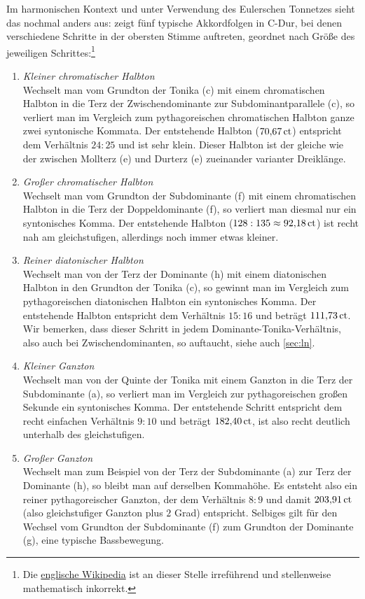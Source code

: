 Im harmonischen Kontext und unter Verwendung des Eulerschen Tonnetzes sieht das
nochmal anders aus:  zeigt fünf typische Akkordfolgen in C-Dur,
bei denen verschiedene Schritte in der obersten Stimme auftreten, geordnet nach
Größe des jeweiligen Schrittes:\footnote{Die
  \href{https://en.wikipedia.org/wiki/Semitone\#Just_intonation}{englische
    Wikipedia} ist an dieser Stelle irreführend und stellenweise mathematisch
  inkorrekt.}
\begin{enumerate}
\item \emph{Kleiner chromatischer Halbton}\\
  Wechselt man vom Grundton der Tonika (c) mit einem chromatischen Halbton in
  die Terz der Zwischendominante zur Subdominantparallele (\sharpmm c), so
  verliert man im Vergleich zum pythagoreischen chromatischen Halbton ganze zwei
  syntonische Kommata. Der entstehende Halbton ($70{,}67\,\text{ct}$) entspricht dem
  Verhältnis $24:25$ und ist sehr klein. Dieser Halbton ist der gleiche wie der
  zwischen Mollterz (\flatp e) und Durterz (\naturalm e) zueinander varianter
  Dreiklänge.
\item \emph{Großer chromatischer Halbton}\\
  Wechselt man vom Grundton der Subdominante (f) mit einem chromatischen Halbton
  in die Terz der Doppeldominante (\sharpm f), so verliert man diesmal nur ein
  syntonisches Komma.  Der entstehende Halbton ($128:135\approx 92{,}18\,\text{ct}$)
  ist recht nah am gleichstufigen, allerdings noch immer etwas
  kleiner.
\item \emph{Reiner diatonischer Halbton}\\
  Wechselt man von der Terz der Dominante (\naturalm h) mit einem diatonischen
  Halbton in den Grundton der Tonika (c), so gewinnt man im Vergleich zum
  pythagoreischen diatonischen Halbton ein syntonisches Komma.  Der entstehende
  Halbton entspricht dem Verhältnis $15:16$ und beträgt $111{,}73\,\text{ct}$.  Wir
  bemerken, dass dieser Schritt in jedem Dominante-Tonika-Verhältnis, also auch
  bei Zwischendominanten, so auftaucht, siehe auch \cref{sec:ln}.
\item \emph{Kleiner Ganzton}\\
  Wechselt man von der Quinte der Tonika mit einem Ganzton in die Terz der
  Subdominante (\naturalm a), so verliert man im Vergleich zur pythagoreischen
  großen Sekunde ein syntonisches Komma. Der entstehende Schritt entspricht dem
  recht einfachen Verhältnis \mbox{$9:10$} und beträgt $182{,}40\,\text{ct}$, ist also
  recht deutlich unterhalb des gleichstufigen.
\item \emph{Großer Ganzton}\\
  Wechselt man zum Beispiel von der Terz der Subdominante (\naturalm a) zur Terz
  der Dominante (\naturalm h), so bleibt man auf derselben Kommahöhe. Es
  entsteht also ein reiner pythagoreischer Ganzton, der dem Verhältnis $8:9$
  und damit $203{,}91\,\text{ct}$ (also gleichstufiger Ganzton plus $2$ Grad)
  entspricht.  Selbiges gilt für den Wechsel vom Grundton der Subdominante (f)
  zum Grundton der Dominante (g), eine typische Bassbewegung.
\end{enumerate}

